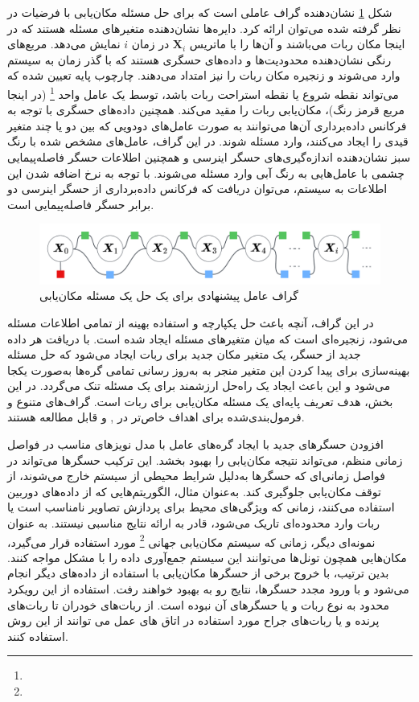 شکل 
\ref{fig:localization}
نشان‌دهنده گراف عاملی است که برای حل مسئله مکان‌یابی با فرضیات در نظر گرفته شده می‌توان ارائه کرد. دایره‌ها نشان‌دهنده متغیرهای مسئله هستند که در اینجا مکان ربات می‌باشند و آن‌ها را با ماتریس
$\boldsymbol{X}_i$ 
در زمان $i$ نمایش می‌دهد. مربع‌های رنگی نشان‌دهنده محدودیت‌ها و داده‌های حسگری هستند که با گذر زمان به سیستم وارد می‌شوند و زنجیره مکان ربات را نیز امتداد می‌دهند. چارچوب پایه تعیین شده که می‌تواند نقطه شروع یا نقطه استراحت ربات باشد، توسط یک عامل واحد
\footnote{}
(در اینجا مربع قرمز رنگ)، مکان‌یابی ربات را مقید می‌کند. همچنین داده‌های حسگری با توجه به فرکانس داده‌برداری آن‌ها می‌توانند به صورت عامل‌های دودویی که بین دو یا چند متغیر قیدی را ایجاد می‌کنند، وارد مسئله شوند. در این گراف، عامل‌های مشخص شده با رنگ سبز نشان‌دهنده اندازه‌گیری‌های حسگر اینرسی و همچنین اطلاعات حسگر فاصله‌پیمایی چشمی با عامل‌هایی به رنگ آبی وارد مسئله می‌شوند. با توجه به نرخ اضافه شدن این اطلاعات به سیستم، می‌توان دریافت که فرکانس داده‌برداری از حسگر اینرسی دو برابر حسگر فاصله‌پیمایی است. 
\begin{figure}
	\centering
	\includegraphics[width=0.7\linewidth]{img/Localization}
	\caption{گراف عامل پیشنهادی برای یک حل یک مسئله مکان‌یابی}
	\label{fig:localization}
\end{figure}

در این گراف، آنچه باعث حل یکپارچه و استفاده بهینه از تمامی اطلاعات مسئله می‌شود، زنجیره‌ای است که میان متغیرهای مسئله ایجاد شده است. با دریافت هر داده جدید از حسگر، یک متغیر مکان جدید برای ربات ایجاد می‌شود که حل مسئله بهینه‌سازی برای پیدا کردن این متغیر منجر به به‌روز رسانی تمامی گره‌ها به‌صورت یکجا می‌شود و این باعث ایجاد یک راه‌حل ارزشمند برای یک مسئله تنک می‌گردد. در این بخش، هدف تعریف پایه‌ای یک مسئله مکان‌یابی برای ربات است. گراف‌های متنوع و فرمول‌بندی‌شده برای اهداف خاص‌تر در
\cite{yang2022indoor}, 
\cite{song2021tightly}
و 
\cite{leitinger2017factor}
قابل مطالعه هستند. 

افزودن حسگرهای جدید با ایجاد گره‌های عامل با مدل نویزهای مناسب در فواصل زمانی منظم، می‌تواند نتیجه مکان‌یابی را بهبود بخشد. این ترکیب حسگرها می‌تواند در فواصل زمانی‌ای که حسگرها به‌دلیل شرایط محیطی از سیستم خارج می‌شوند، از توقف مکان‌یابی جلوگیری کند. به‌عنوان مثال، الگوریتم‌هایی که از داده‌های دوربین استفاده می‌کنند، زمانی که ویژگی‌های محیط برای پردازش تصاویر نامناسب است یا ربات وارد محدوده‌ای تاریک می‌شود، قادر به ارائه نتایج مناسبی نیستند. به عنوان نمونه‌ای دیگر، زمانی که سیستم مکان‌یابی جهانی
\footnote{}
مورد استفاده قرار می‌گیرد، مکان‌هایی همچون تونل‌ها می‌توانند این سیستم جمع‌آوری داده را با مشکل مواجه کنند. بدین ترتیب، با خروج برخی از حسگرها مکان‌یابی با استفاده از داده‌های دیگر انجام می‌شود و با ورود مجدد حسگرها، نتایج رو به بهبود خواهند رفت. استفاده از این رویکرد محدود به نوع ربات و یا حسگرهای آن نبوده است.  
از ربات‌های خودران
\cite{wilbers2019localization}
تا ربات‌های پرنده
\cite{dai2022uav}
و یا ربات‌های جراح مورد استفاده در اتاق های عمل می توانند از این روش استفاده کنند. 


